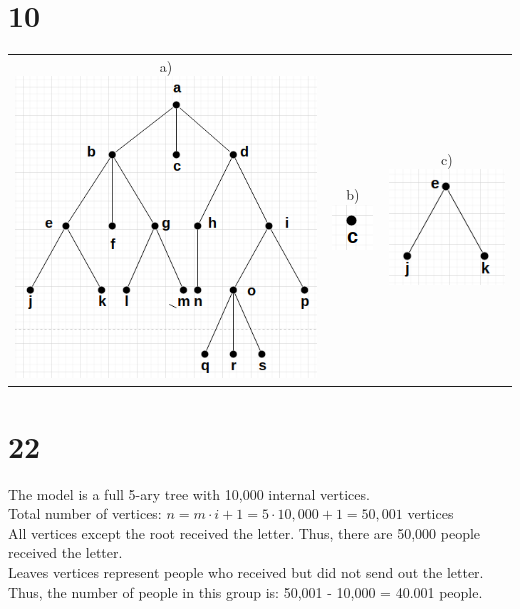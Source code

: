 \documentclass[12pt]{article}
\begin{document}
    \section*{10}
      \begin{center}
        \begin{tabular}{ccc}
          a)
          \includegraphics{10_a.png} 
          & 
          b)
          \includegraphics{10_c.png} 
          & 
          c)
          \includegraphics{10_e.png} 
        \end{tabular}
      \end{center}
    \section*{22}
      The model is a full 5-ary tree with 10,000 internal vertices. \\
      Total number of vertices: \(n = m \cdot i + 1 = 5 \cdot 10,000 + 1 = 50,001 \) vertices \\
      All vertices except the root received the letter. Thus, there are 50,000 people received the letter.\\
      Leaves vertices represent people who received but did not send out the letter. Thus, the number of people in this group is: 50,001 - 10,000 = 40.001 people.
\end{document}
